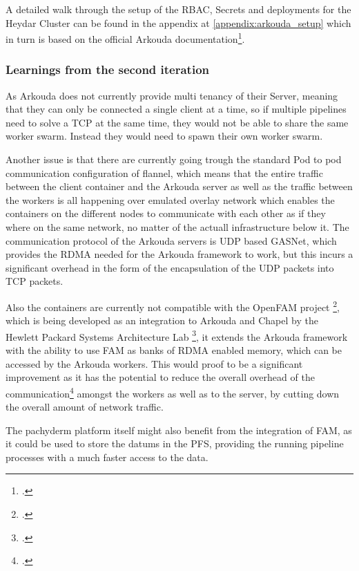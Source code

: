A detailed walk through the setup of the \ac{RBAC}, Secrets and deployments for the Heydar Cluster can be found in the appendix at \ref{appendix:arkouda_setup} which in turn is based on the official
Arkouda documentation\footcite{ArkoudacontribArkoudadockerMain}.

\subsubsection*{Learnings from the second iteration}
As Arkouda does not currently provide multi tenancy of their Server, meaning that they can only be connected a single client at a time, 
so if multiple pipelines need to solve a \ac{TCP} at the same time, they would not be able to share the same worker swarm.
Instead they would need to spawn their own worker swarm.

Another issue is that there are currently going trough the standard Pod to pod communication configuration of flannel, which means that the entire traffic between the client container and the Arkouda server 
as well as the traffic between the workers is all happening over emulated overlay network which enables the containers on the different nodes to communicate with each other as if they where on the same network, no matter of the actuall infrastructure below it.
The communication protocol of the Arkouda servers is \ac{UDP} based \ac{GASNet}, which provides the \ac{RDMA} needed for the Arkouda framework to work, but this incurs a significant overhead in the form of the encapsulation of the \ac{UDP} packets into \ac{TCP} packets.

Also the containers are currently not compatible with the OpenFAM project \footcite{keetonOpenFAMAPIProgramming2019}, which is being developed as an integration to Arkouda and Chapel by the Hewlett Packard Systems Architecture Lab \footcite{byrneCouplingChapelPoweredHPC2023},
it extends the Arkouda framework with the ability to use \ac{FAM} as banks of \ac{RDMA} enabled memory, which can be accessed by the Arkouda workers.
This would proof to be a significant improvement as it has the potential to reduce the overall overhead of the communication\Footcite{chouOptimizingPostCopyLive2019} amongst the workers as well as to the server, by cutting down the overall amount of network traffic.

The pachyderm platform itself might also benefit from the integration of \ac{FAM}, as it could be used to store the datums in the \ac{PFS}, providing the running pipeline processes with a much faster access to the data.


